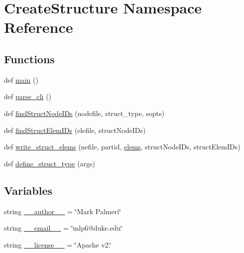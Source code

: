 \hypertarget{namespaceCreateStructure}{}\section{Create\+Structure Namespace Reference}
\label{namespaceCreateStructure}
\subsection*{Functions}
\begin{DoxyCompactItemize}
\item 
def \hyperlink{namespaceCreateStructure_a57d4ef83537d7827ccc0b7ce38e6ed71}{main} ()
\item 
def \hyperlink{namespaceCreateStructure_a87cbbc5a5918740c6829e09d30e559f9}{parse\+\_\+cli} ()
\item 
def \hyperlink{namespaceCreateStructure_adb8b4bdc9bf91c9a387292212c3442d2}{find\+Struct\+Node\+I\+Ds} (nodefile, struct\+\_\+type, sopts)
\item 
def \hyperlink{namespaceCreateStructure_a5024d9dcd58c4608f6b1f60f4b7137c3}{find\+Struct\+Elem\+I\+Ds} (elefile, struct\+Node\+I\+Ds)
\item 
def \hyperlink{namespaceCreateStructure_af9bec4cba8ad21e2c1bc76d814c5e195}{write\+\_\+struct\+\_\+elems} (nefile, partid, \hyperlink{NodeElemVol_8m_aa3f4ee045b78c72269723da58ac60d0b}{elems}, struct\+Node\+I\+Ds, struct\+Elem\+I\+Ds)
\item 
def \hyperlink{namespaceCreateStructure_aa11f8b9be9a8d76084888cf502131db3}{define\+\_\+struct\+\_\+type} (args)
\end{DoxyCompactItemize}
\subsection*{Variables}
\begin{DoxyCompactItemize}
\item 
string \hyperlink{namespaceCreateStructure_af899f84eadfd33b75fcb445284af33ee}{\+\_\+\+\_\+author\+\_\+\+\_\+} = \char`\"{}Mark Palmeri\char`\"{}
\item 
string \hyperlink{namespaceCreateStructure_a47fde5fe18b96e7c414f7ce0ed9becab}{\+\_\+\+\_\+email\+\_\+\+\_\+} = \char`\"{}mlp6@duke.\+edu\char`\"{}
\item 
string \hyperlink{namespaceCreateStructure_a11f329784c7441166b757bac532d3fef}{\+\_\+\+\_\+license\+\_\+\+\_\+} = \char`\"{}Apache v2.\char`\"{}
\end{DoxyCompactItemize}


